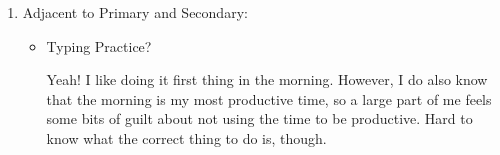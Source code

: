 \documentclass[12pt]{article}
\renewcommand{\,}{\textsuperscript{,}}
\begin{document}
\begin{enumerate}
\begin{itemize}
\begin{itemize}
\begin{itemize}
\item I guess that the stuff for intro to quantum video counts here.

\item Plots from the actual results of the runs, to make sure that it worked out.\footnote{SSC, AAT, if any vib states were good, what happened to the computations, etc}.

\end{itemize}

\item Organizing citations?

I spent a little bit of time yesterday, and I also realized that I had not ever actually made the .bib file for the thesis, so set that up as well.

\end{itemize}

\item Love:

\begin{itemize}

\item Taking risks?

Marginally!

\item Making efforts?

Minimally!

\item Showing affection?

Yeah!

\item Being honest?

Trying to

\item Being open?

Eh.

\item Being appropriately vulnerable?

Yeah

\end{itemize}

\end{itemize}

\item Adjacent to Primary and Secondary:

\begin{itemize}

\item Typing Practice?

Yeah! I like doing it first thing in the morning. However, I do also know that the morning is my most productive time, so a large part of me feels some bits of guilt about not using the time to be productive. Hard to know what the correct thing to do is, though.


\end{itemize}
\end{enumerate}
\end{document}

